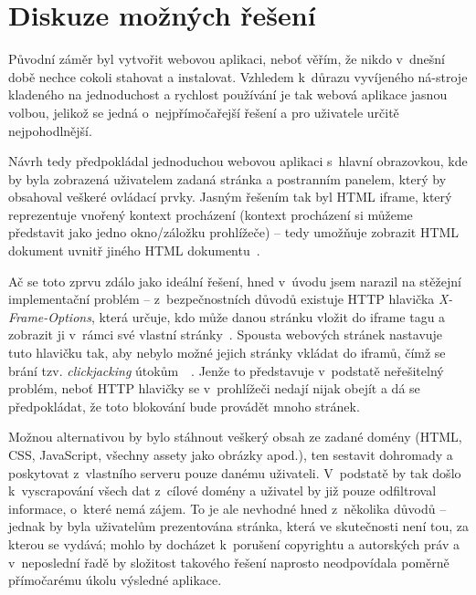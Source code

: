 \documentclass[thesis=B,czech]{FITthesis}[2012/06/26]
\begin{document}

\label{sec:possible_solutions}
\section{Diskuze možných řešení}
Původní záměr byl vytvořit webovou aplikaci, neboť věřím, že nikdo v~dnešní době nechce cokoli stahovat a instalovat. Vzhledem k~důrazu vyvíjeného ná-stroje kladeného na jednoduchost a rychlost používání je tak webová aplikace jasnou volbou, jelikož se jedná o~nejpřímočařejší řešení a pro uživatele určitě nejpohodlnější.

Návrh tedy předpokládal jednoduchou webovou aplikaci s~hlavní obrazovkou, kde by byla zobrazená uživatelem zadaná stránka a postranním panelem, který by obsahoval veškeré ovládací prvky. Jasným řešením tak byl HTML iframe, který reprezentuje vnořený kontext procházení (kontext procházení si můžeme představit jako jedno okno/záložku prohlížeče) -- tedy umožňuje zobrazit HTML dokument uvnitř jiného HTML dokumentu~\cite{iframe}.

Ač se toto zprvu zdálo jako ideální řešení, hned v~úvodu jsem narazil na stěžejní implementační problém -- z~bezpečnostních důvodů existuje HTTP hlavička \emph{X-Frame-Options}, která určuje, kdo může danou stránku vložit do iframe tagu a zobrazit ji v~rámci své vlastní stránky~\cite{x_frame_options}. Spousta webových stránek nastavuje tuto hlavičku tak, aby nebylo možné jejich stránky vkládat do iframů, čímž se brání tzv. \emph{clickjacking} útokům~\cite{clickjacking}~\cite{clickjacking_defense}. Jenže to představuje v~podstatě neřešitelný problém, neboť HTTP hlavičky se v~prohlížeči nedají nijak obejít a dá se předpokládat, že toto blokování bude provádět mnoho stránek.

Možnou alternativou by bylo stáhnout veškerý obsah ze zadané domény (HTML, CSS, JavaScript, všechny assety jako obrázky apod.), ten sestavit dohromady a poskytovat z~vlastního serveru pouze danému uživateli. V~podstatě by tak došlo k~vyscrapování všech dat z~cílové domény a uživatel by již pouze odfiltroval informace, o~které nemá zájem. To je ale nevhodné hned z~několika důvodů -- jednak by byla uživatelům prezentována stránka, která ve skutečnosti není tou, za kterou se vydává; mohlo by docházet k~porušení copyrightu a autorských práv a v~neposlední řadě by složitost takového řešení naprosto neodpovídala poměrně přímočarému úkolu výsledné aplikace.
\end{document}
